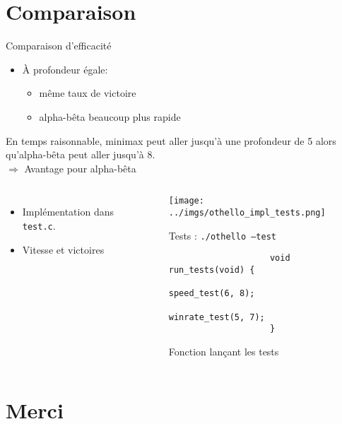 \documentclass{beamer}
\begin{document}
\section{Comparaison}
\begin{frame}[fragile]{Comparaison d'efficacité}
     {
        \vspace{25mm}
        \begin{itemize}
            \item À profondeur égale:
                  \begin{itemize}
                      \item même taux de victoire
                      \item alpha-bêta beaucoup plus rapide
                  \end{itemize}
        \end{itemize}

        En temps raisonnable, minimax peut aller jusqu'à une profondeur de 5
        alors qu'alpha-bêta peut aller jusqu'à 8.\\
        $\Rightarrow$ Avantage pour alpha-bêta
    }
    \begin{columns}[onlytextwidth]
        \def\rcolumn{60mm} %
        \column{\linewidth-\rcolumn+1mm} %
        \begin{itemize}
            \item<1-2> Implémentation dans \texttt{test.c}.
            \item<2> Vitesse et victoires
        \end{itemize}
        \column{\rcolumn-5mm} %

        \begin{overprint}
            \begin{figure}
                \texttt{[image: ../imgs/othello\_impl\_tests.png]}
                \caption*{Tests : \texttt{./othello --test}}
            \end{figure}
            \vspace{15mm}
            \begin{figure}
                \begin{verbatim}
                    void run_tests(void) {
                        speed_test(6, 8);
                        winrate_test(5, 7);
                    }
                \end{verbatim}
                \caption*{Fonction lançant les tests}
            \end{figure}
        \end{overprint}
    \end{columns}
\end{frame}

\appendix
\section{\hspace{3cm} Merci}
\end{document}
